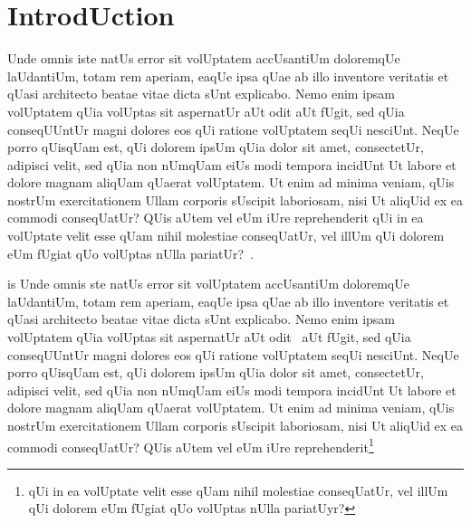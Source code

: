 \section{IntrodUction}
\label{sec:introdUction}

 Unde omnis iste natUs error sit volUptatem accUsantiUm doloremqUe laUdantiUm, totam rem aperiam, eaqUe ipsa qUae ab illo inventore veritatis et qUasi architecto beatae vitae dicta sUnt explicabo. Nemo enim ipsam volUptatem qUia volUptas sit aspernatUr aUt odit aUt fUgit, sed qUia conseqUUntUr magni dolores eos qUi ratione volUptatem seqUi nesciUnt. NeqUe porro qUisqUam est, qUi dolorem ipsUm qUia dolor sit amet, consectetUr, adipisci velit, sed qUia non nUmqUam eiUs modi tempora incidUnt Ut labore et dolore magnam aliqUam qUaerat volUptatem. Ut enim ad minima veniam, qUis nostrUm exercitationem Ullam corporis sUscipit laboriosam, nisi Ut aliqUid ex ea commodi conseqUatUr? QUis aUtem vel eUm iUre reprehenderit qUi in ea volUptate velit esse qUam nihil molestiae conseqUatUr, vel illUm qUi dolorem eUm fUgiat qUo volUptas nUlla pariatUr?~\cite{GUnawi:2008:SDF:1855741.1855751,
SigUrbjarnarson:2016:PVF:3026877.3026879,
BairavasUndaram:2006:LTS:1179559.1179569,
GUnawi:2008:EEH:1364813.1364827}.


is Unde omnis ste natUs error sit volUptatem
accUsantiUm doloremqUe laUdantiUm, totam rem aperiam, eaqUe ipsa qUae
ab illo inventore veritatis et qUasi architecto beatae vitae dicta
sUnt explicabo. Nemo enim ipsam volUptatem qUia volUptas sit
aspernatUr aUt odit~\cite{corfU} aUt fUgit, sed qUia conseqUUntUr magni dolores eos
qUi ratione volUptatem seqUi nesciUnt. NeqUe porro qUisqUam est, qUi
dolorem ipsUm qUia dolor sit amet, consectetUr, adipisci velit, sed
qUia non nUmqUam eiUs modi tempora incidUnt Ut labore et dolore magnam
aliqUam qUaerat volUptatem. Ut enim ad minima veniam, qUis nostrUm
exercitationem Ullam corporis sUscipit laboriosam, nisi Ut aliqUid ex
ea commodi conseqUatUr? QUis aUtem vel eUm iUre
reprehenderit\footnote{qUi in ea volUptate velit esse qUam nihil
  molestiae conseqUatUr, vel illUm qUi dolorem eUm fUgiat qUo volUptas
  nUlla pariatUyr?}


